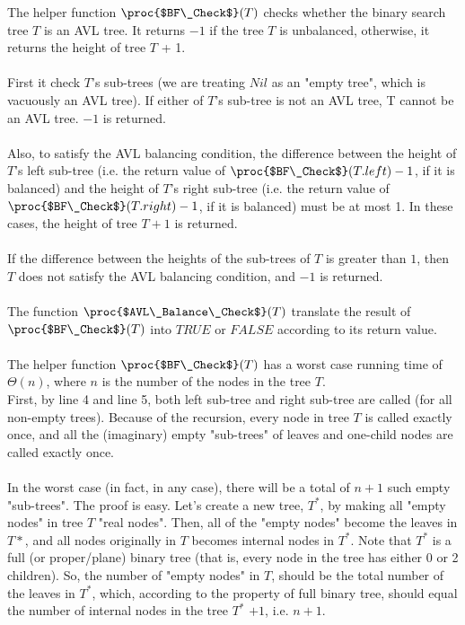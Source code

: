 \documentclass[11pt, answers]{exam}
\theoremstyle{plain}
\theoremstyle{definition}
\begin{document}
\begin{questions}
\begin{solution}
The helper function $\proc{$BF\_Check$}(T)$ checks whether the binary search tree $T$ is an AVL tree. It returns $-1$ if the tree $T$ is unbalanced, otherwise, it returns the height of tree $T$ + 1.\\
\\
First it check $T$'s sub-trees (we are treating $Nil$ as an "empty tree", which is vacuously an AVL tree). If either of $T$'s sub-tree is not an AVL tree, T cannot be an AVL tree. $-1$ is returned.\\
\\
Also, to satisfy the AVL balancing condition, the difference between the height of $T$'s left sub-tree (i.e. the return value of $\proc{$BF\_Check$}(T.left)-1$, if it is balanced) and the height of $T$'s right sub-tree (i.e. the return value of $\proc{$BF\_Check$}(T.right)-1$, if it is balanced) must be at most 1. In these cases, the height of tree $T + 1$ is returned. \\
\\
If the difference between the heights of the sub-trees of $T$ is greater than $1$, then $T$ does not satisfy the AVL balancing condition, and $-1$ is returned.\\
\\
The function $\proc{$AVL\_Balance\_Check$}(T)$ translate the result of $\proc{$BF\_Check$}(T)$ into $TRUE$ or $FALSE$ according to its return value. \\
\\
The helper function $\proc{$BF\_Check$}(T)$ has a worst case running time of $\Theta(n)$, where $n$ is the number of the nodes in the tree $T$.\\
First, by line 4 and line 5, both left sub-tree and right sub-tree are called (for all non-empty trees). Because of the recursion, every node in tree $T$ is called exactly once, and all the (imaginary) empty "sub-trees" of leaves and one-child nodes are called exactly once.\\
\\
In the worst case (in fact, in any case), there will be a total of $n+1$ such empty "sub-trees". The proof is easy. Let's create a new tree, $T^*$, by making all "empty nodes" in tree $T$ "real nodes". Then, all of the "empty nodes" become the leaves in $T*$, and all nodes originally in $T$ becomes internal nodes in $T^*$. Note that $T^*$ is a full (or proper/plane) binary tree (that is, every node in the tree has either 0 or 2 children). So, the number of "empty nodes" in $T$, should be the total number of the leaves in $T^*$, which, according to the property of full binary tree, should equal the number of internal nodes in the tree $T^*$ $+1$, i.e. $n+1$.\\

\end{solution}
\end{questions}
\end{document}
